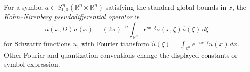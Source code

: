
For a symbol $a\in S^m_{1,0}(\mathbb R^n\times\mathbb R^n)$ satisfying the standard global bounds in $x$, the \emph{Kohn--Nirenberg pseudodifferential operator} is
\[
a(x,D)u(x)=(2\pi)^{-n}\int_{\mathbb R^n}e^{ix\cdot\xi}a(x,\xi)\widehat u(\xi)\,d\xi
\]
for Schwartz functions $u$, with Fourier transform $\widehat u(\xi)=\int_{\mathbb R^n}e^{-ix\cdot\xi}u(x)\,dx$. Other Fourier and quantization conventions change the displayed constants or symbol expression.
